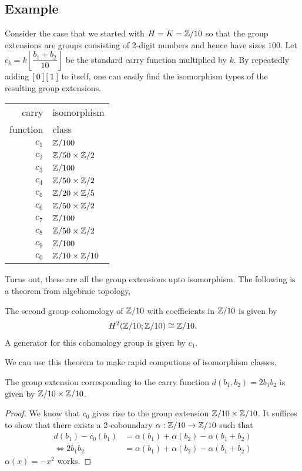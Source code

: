 \subsection{Example}
Consider the case that we started with $H = K = \mathbb{Z}/10$ so that the group extensions are groups consisting of 2-digit numbers and hence have sizes $100$.
Let $c_k = k \left \lfloor \dfrac{b_1 + b_2}{10}  \right \rfloor$ be the standard carry function multiplied by $k$. By repeatedly adding $\left[\: 0 \:\right]\left[\: 1 \:\right]$ to itself, one can easily find the isomorphism types of the resulting group extensions.
\begin{center}
  \begin{tabular}{|r|l|}
    \hline
    carry  & isomorphism\\
    function & class \\\hline
    $c_1$ & $\mathbb{Z}/100$ \\
    $c_2$ & $\mathbb{Z}/50 \times \mathbb{Z}/2$ \\
    $c_3$ & $\mathbb{Z}/100$ \\
    $c_4$ & $\mathbb{Z}/50 \times \mathbb{Z}/2$ \\
    $c_5$ & $\mathbb{Z}/20 \times \mathbb{Z}/5$ \\
    $c_6$ & $\mathbb{Z}/50 \times \mathbb{Z}/2$ \\
    $c_7$ & $\mathbb{Z}/100$ \\
    $c_8$ & $\mathbb{Z}/50 \times \mathbb{Z}/2$ \\
    $c_9$ & $\mathbb{Z}/100$ \\
    $c_0$ & $\mathbb{Z}/10 \times \mathbb{Z}/10$ \\\hline
  \end{tabular}
\end{center}
Turns out, these are all the group extensions upto isomorphism.
The following is a theorem from algebraic topology,
\begin{theorem}
  The second group cohomology of $\mathbb{Z}/10$ with coefficients in $\mathbb{Z}/10$ is given by \label{theorem:cohomologyOfZ10}
    \begin{align*}
      H^2(\mathbb{Z}/10; \mathbb{Z}/10) \cong \mathbb{Z}/10.
    \end{align*}
    A generator for this cohomology group is given by $c_1$.
\end{theorem}
We can use this theorem to make rapid computions of isomorphism classes.
\begin{proposition}
  The group extension corresponding to the carry function $d(b_1, b_2) = 2 b_1 b_2$ is given by $\mathbb{Z}/10 \times \mathbb{Z}/10$.
\end{proposition}
\begin{proof}
  We know that $c_0$ gives rise to the group extension $\mathbb{Z}/10 \times \mathbb{Z}/10$.
  It suffices to show that there exists a 2-coboundary $\alpha:\mathbb{Z}/10 \rightarrow \mathbb{Z}/10$ such that
  \begin{align*}
    d(b_1) - c_0(b_1) &= \alpha(b_1) + \alpha(b_2) - \alpha(b_1 + b_2) \\
    \Longleftrightarrow 2 b_1 b_2 &= \alpha(b_1) + \alpha(b_2) - \alpha(b_1 + b_2)
  \end{align*}
  $\alpha(x) = -x^2$ works.
\end{proof}
